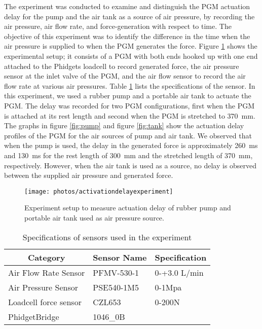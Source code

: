 \documentclass[paper,JRM,paper]{jaciiiarticle}
\begin{document}
The experiment was conducted to examine and distinguish the PGM actuation delay for the pump and the air tank as a source of air pressure, by recording the air pressure, air flow rate, and force-generation with respect to time. The objective of this experiment was to identify the difference in the time when the air pressure is supplied to when the PGM generates the force. Figure \ref{fig:activationdelayexperiment} shows the experimental setup; it consists of a PGM with both ends hooked up with one end attached to the Phidgets loadcell to record generated force, the air pressure sensor at the inlet valve of the PGM, and the air flow sensor to record the air flow rate at various air pressures. Table \ref{sensordetails} lists the specifications of the sensor. In this experiment, we used a rubber pump and a portable air tank to actuate the PGM. The delay was recorded for two PGM configurations, first when the PGM is attached at its rest length and second when the PGM is stretched to  \SI{370}{\milli\meter}. The graphs in figure \ref{fig:pump} and figure \ref{fig:tank} show the actuation delay profiles of the PGM for the air sources of pump and air tank. We observed that when the pump is used, the delay in the generated force is approximately \SI{260}{\milli\second} and \SI{130}{\milli\second} for the rest length of \SI{300}{\milli\meter} and the stretched length of \SI{370}{\milli\meter}, respectively. However, when the air tank is used as a source, no delay is observed between the supplied air pressure and generated force.

\begin{figure}
	\centering
	\texttt{[image: photos/activationdelayexperiment]}
	\caption{Experiment setup to measure actuation delay of rubber pump and portable air tank used as air pressure source.}
	\label{fig:activationdelayexperiment}
\end{figure}

\begin{table}[]
	\caption{Specifications of sensors used in the experiment}
	\begin{tabular}{@{}lll@{}}
		\toprule
		\multicolumn{1}{c}{Category} & \multicolumn{1}{c}{Sensor Name} & \multicolumn{1}{c}{Specification} \\ \midrule
		Air Flow Rate Sensor & PFMV-530-1  & 0-+3.0 L/min \\
		Air Pressure Sensor & PSE540-1M5  & 0-1Mpa \\
		Loadcell force sensor & CZL653   & 0-200N \\
		PhidgetBridge & 1046\_0B  &  \\ \bottomrule
	\end{tabular}

	\label{sensordetails}
\end{table}
\end{document}
